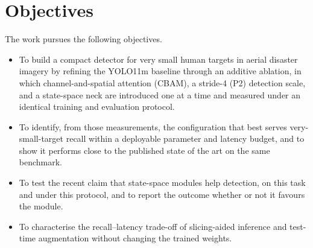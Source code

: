\section{Objectives}
The work pursues the following objectives.
\begin{itemize}
  \item To build a compact detector for very small human targets in aerial
        disaster imagery by refining the YOLO11m baseline through an additive
        ablation, in which channel-and-spatial attention (CBAM), a stride-4
        (P2) detection scale, and a state-space neck are introduced one at a
        time and measured under an identical training and evaluation protocol.
  \item To identify, from those measurements, the configuration that best
        serves very-small-target recall within a deployable parameter and
        latency budget, and to show it performs close to the published state
        of the art on the same benchmark.
  \item To test the recent claim that state-space modules help detection, on
        this task and under this protocol, and to report the outcome whether
        or not it favours the module.
  \item To characterise the recall--latency trade-off of slicing-aided
        inference and test-time augmentation without changing the trained
        weights.
\end{itemize}

